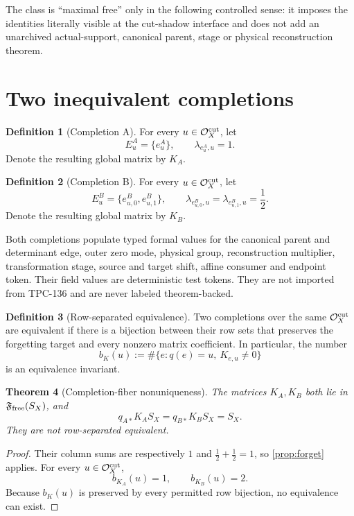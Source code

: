 \documentclass[11pt]{article}
\newtheorem{theorem}{Theorem}[section]
\theoremstyle{definition}
\newtheorem{definition}[theorem]{Definition}
\theoremstyle{remark}
\newcommand{\Ocut}{\mathcal O_X^{\rm cut}}
\begin{document}
The class is ``maximal free'' only in the following controlled sense:
it imposes the identities literally visible at the cut-shadow
interface and does not add an unarchived actual-support, canonical
parent, stage or physical reconstruction theorem.

\section{Two inequivalent completions}

\begin{definition}[Completion A]
For every \(u\in\Ocut\), let
\[
 E_u^A=\{e_u^A\},\qquad \lambda_{e_u^A,u}=1.
\]
Denote the resulting global matrix by \(K_A\).
\end{definition}

\begin{definition}[Completion B]
For every \(u\in\Ocut\), let
\[
 E_u^B=\{e_{u,0}^B,e_{u,1}^B\},\qquad
 \lambda_{e_{u,0}^B,u}
 =\lambda_{e_{u,1}^B,u}=\frac12.
\]
Denote the resulting global matrix by \(K_B\).
\end{definition}

Both completions populate typed formal values for the canonical
parent and determinant edge, outer zero mode, physical group,
reconstruction multiplier, transformation stage, source and target
shift, affine consumer and endpoint token.  Their field values are
deterministic test tokens.  They are not imported from TPC-136 and
are never labeled theorem-backed.

\begin{definition}[Row-separated equivalence]
Two completions over the same \(\Ocut\) are equivalent if there is a
bijection between their row sets that preserves the forgetting
target and every nonzero matrix coefficient.  In particular, the
number
\[
 b_K(u):=\#\{e:q(e)=u,\ K_{e,u}\ne0\}
\]
is an equivalence invariant.
\end{definition}

\begin{theorem}[Completion-fiber nonuniqueness]
\label{thm:nonunique}
The matrices \(K_A,K_B\) both lie in
\(\mathfrak F_{\rm free}(S_X)\), and
\[
 q_{A*}K_AS_X=q_{B*}K_BS_X=S_X.
\]
They are not row-separated equivalent.
\end{theorem}

\begin{proof}
Their column sums are respectively \(1\) and
\(\frac12+\frac12=1\), so \cref{prop:forget} applies.  For every
\(u\in\Ocut\),
\[
 b_{K_A}(u)=1,\qquad b_{K_B}(u)=2.
\]
Because \(b_K(u)\) is preserved by every permitted row bijection, no
equivalence can exist.
\end{proof}
\end{document}
